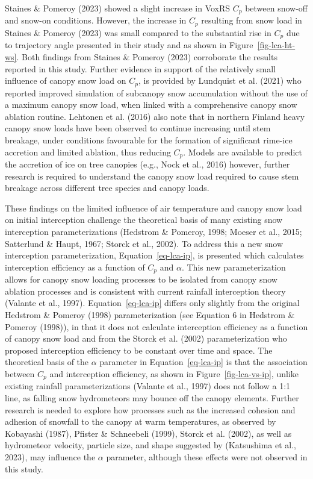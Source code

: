 \documentclass[
  letterpaper,
  DIV=11,
  numbers=noendperiod]{scrartcl}
\begin{document}
Staines \& Pomeroy (2023) showed a slight increase in VoxRS \(C_p\)
between snow-off and snow-on conditions. However, the increase in
\(C_p\) resulting from snow load in Staines \& Pomeroy (2023) was small
compared to the substantial rise in \(C_p\) due to trajectory angle
presented in their study and as shown in Figure~\ref{fig-lca-ht-ws}.
Both findings from Staines \& Pomeroy (2023) corroborate the results
reported in this study. Further evidence in support of the relatively
small influence of canopy snow load on \(C_p\), is provided by Lundquist
et al. (2021) who reported improved simulation of subcanopy snow
accumulation without the use of a maximum canopy snow load, when linked
with a comprehensive canopy snow ablation routine. Lehtonen et al.
(2016) also note that in northern Finland heavy canopy snow loads have
been observed to continue increasing until stem breakage, under
conditions favourable for the formation of significant rime-ice
accretion and limited ablation, thus reducing \(C_p\). Models are
available to predict the accretion of ice on tree canopies (e.g., Nock
et al., 2016) however, further research is required to understand the
canopy snow load required to cause stem breakage across different tree
species and canopy loads.

These findings on the limited influence of air temperature and canopy
snow load on initial interception challenge the theoretical basis of
many existing snow interception parameterizations (Hedstrom \& Pomeroy,
1998; Moeser et al., 2015; Satterlund \& Haupt, 1967; Storck et al.,
2002). To address this a new snow interception parameterization,
Equation~\ref{eq-lca-ip}, is presented which calculates interception
efficiency as a function of \(C_p\) and \(\alpha\). This new
parameterization allows for canopy snow loading processes to be isolated
from canopy snow ablation processes and is consistent with current
rainfall interception theory (Valante et al., 1997).
Equation~\ref{eq-lca-ip} differs only slightly from the original
Hedstrom \& Pomeroy (1998) parameterization (see Equation 6 in Hedstrom
\& Pomeroy (1998)), in that it does not calculate interception
efficiency as a function of canopy snow load and from the Storck et al.
(2002) parameterization who proposed interception efficiency to be
constant over time and space. The theoretical basis of the \(\alpha\)
parameter in Equation~\ref{eq-lca-ip} is that the association between
\(C_p\) and interception efficiency, as shown in
Figure~\ref{fig-lca-vs-ip}, unlike existing rainfall parameterizations
(Valante et al., 1997) does not follow a 1:1 line, as falling snow
hydrometeors may bounce off the canopy elements. Further research is
needed to explore how processes such as the increased cohesion and
adhesion of snowfall to the canopy at warm temperatures, as observed by
Kobayashi (1987), Pfister \& Schneebeli (1999), Storck et al. (2002), as
well as hydrometeor velocity, particle size, and shape suggested by
(Katsushima et al., 2023), may influence the \(\alpha\) parameter,
although these effects were not observed in this study.
\end{document}
